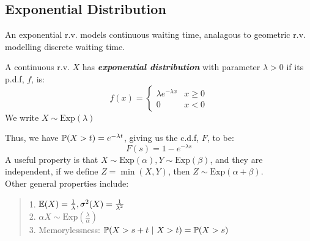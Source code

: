 \subsection{Exponential Distribution}
An exponential r.v. models continuous waiting time, analagous to geometric r.v. modelling discrete waiting time.
\begin{definition}
    A continuous r.v. $X$ has \textbf{\textit{exponential distribution}} with parameter $\lambda > 0$ if its p.d.f, $f$, is:
    $$f(x) = \begin{cases}
        \lambda e^{-\lambda x} & x \ge 0 \\
        0 & x < 0
    \end{cases}$$
    We write $X \sim \text{Exp}(\lambda)$
\end{definition}
Thus, we have $\mathbb{P}(X > t) = e^{-\lambda t}$, giving us the c.d.f, $F$, to be:
$$F(s) = 1 - e^{-\lambda s}$$
A useful property is that $X \sim \text{Exp}(\alpha), Y \sim \text{Exp}(\beta)$, and they are independent, if we define $Z = \min(X, Y)$, then $Z \sim \text{Exp}(\alpha + \beta)$. \\
Other general properties include:
\begin{quote}
    1. $\mathbb{E}(X) = \frac{1}{\lambda}, \sigma^2(X) = \frac{1}{\lambda^2}$ \\
    2. $\alpha X \sim \text{Exp}(\frac{\lambda}{\alpha})$ \\
    3. Memorylessness: $\mathbb{P}(X > s + t \ | \ X > t) = \mathbb{P}(X > s)$
\end{quote}

\newpage